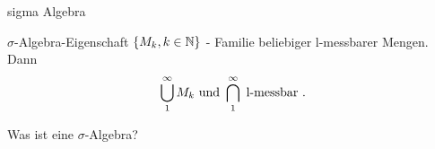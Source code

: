 \documentclass[class=article, crop=false]{standalone}
\begin{document}
\begin{zettel}{sigma Algebra}
\begin{flashcard}[5cmw2k6n]{$\sigma$-Algebra-Eigenschaft}
	$\set{M_k, k \in \N }$ - Familie beliebiger l-messbarer Mengen. Dann
	\[
		\bigcup_1^{\infty} M_k \text{ und } \bigcap_1^{\infty} \text{ l-messbar }
	.\]
\end{flashcard}
Was ist eine $\sigma$-Algebra?

\end{zettel}
\end{document}
